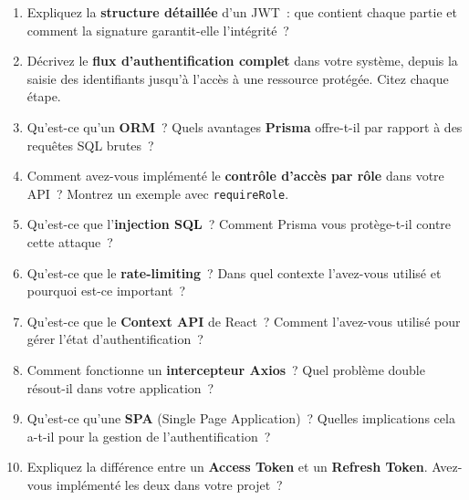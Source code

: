 \documentclass[12pt,a4paper,oneside]{report}
\begin{document}
\begin{enumerate}[
  leftmargin=1.5cm,
  label=\textcolor{MedBlue}{\textbf{Q\arabic*.}},
  start=11,
  itemsep=10pt
]

\item Expliquez la \textbf{structure détaillée} d'un JWT~: que contient
      chaque partie et comment la signature garantit-elle l'intégrité~?

\item Décrivez le \textbf{flux d'authentification complet} dans votre
      système, depuis la saisie des identifiants jusqu'à l'accès à une
      ressource protégée. Citez chaque étape.

\item Qu'est-ce qu'un \textbf{ORM}~? Quels avantages \textbf{Prisma}
      offre-t-il par rapport à des requêtes SQL brutes~?

\item Comment avez-vous implémenté le \textbf{contrôle d'accès par rôle}
      dans votre API~? Montrez un exemple avec \texttt{requireRole}.

\item Qu'est-ce que l'\textbf{injection SQL}~? Comment Prisma vous
      protège-t-il contre cette attaque~?

\item Qu'est-ce que le \textbf{rate-limiting}~? Dans quel contexte
      l'avez-vous utilisé et pourquoi est-ce important~?

\item Qu'est-ce que le \textbf{Context API} de React~? Comment
      l'avez-vous utilisé pour gérer l'état d'authentification~?

\item Comment fonctionne un \textbf{intercepteur Axios}~? Quel problème
      double résout-il dans votre application~?

\item Qu'est-ce qu'une \textbf{SPA} (Single Page Application)~? Quelles
      implications cela a-t-il pour la gestion de l'authentification~?

\item Expliquez la différence entre un \textbf{Access Token} et un
      \textbf{Refresh Token}. Avez-vous implémenté les deux dans votre
      projet~?

\end{enumerate}

\vspace{0.8cm}

\end{document}
